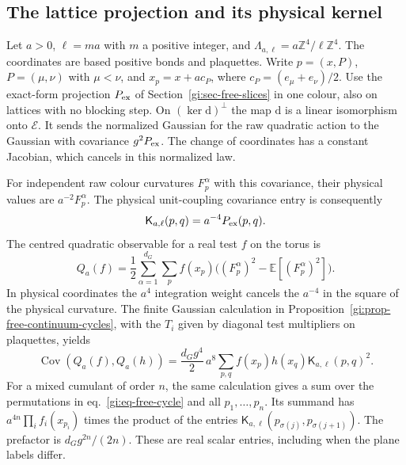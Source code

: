 \documentclass[11pt,letterpaper,reqno]{amsart}
\numberwithin{equation}{section}
\renewcommand{\eqref}[1]{\textup{eq.~\ref{#1}}}
\theoremstyle{definition}
\theoremstyle{remark}
\begin{document}
\subsection{The lattice projection and its physical kernel}

Let \(a>0\), \(\ell=ma\) with \(m\) a positive integer, and
\(\Lambda_{a,\ell}=a\mathbb Z^4/\ell\mathbb Z^4\).
The coordinates are based positive bonds and plaquettes.
Write \(p=(x,P)\), \(P=(\mu,\nu)\) with \(\mu<\nu\), and
\(x_p=x+ac_P\), where \(c_P=(e_\mu+e_\nu)/2\).
Use the exact-form projection \(P_{\rm ex}\) of
Section~\ref{gi:sec-free-slices} in one colour, also on lattices
with no blocking step. On \((\ker\mathrm d)^\perp\) the map
\(\mathrm d\) is a linear isomorphism onto \(\mathcal E\).
It sends the normalized Gaussian for the raw quadratic
action to the Gaussian with covariance \(g^2P_{\rm ex}\).
The change of coordinates has a constant Jacobian, which
cancels in this normalized law.

For independent raw colour curvatures \(F_p^\alpha\) with
this covariance, their physical values are \(a^{-2}F_p^\alpha\).
The physical unit-coupling covariance entry is consequently
\begin{equation}\label{gi:eq-lattice-curvature-kernel}
            \mathsf K_{a,\ell}(p,q)=a^{-4}P_{\rm ex}(p,q).
\end{equation}
The centred quadratic observable for a real test \(f\) on the
torus is
\begin{equation}\label{gi:eq-free-lattice-density}
 Q_a(f)=\frac12\sum_{\alpha=1}^{d_G}\sum_p f(x_p)
                \bigl((F_p^\alpha)^2-\mathbb E[(F_p^\alpha)^2]\bigr).
\end{equation}
In physical coordinates the \(a^4\) integration weight cancels
the \(a^{-4}\) in the square of the physical curvature.
The finite Gaussian calculation in
Proposition~\ref{gi:prop-free-continuum-cycles}, with the \(T_i\)
given by diagonal test multipliers on plaquettes, yields
\begin{equation}\label{gi:eq-free-lattice-wick}
 \operatorname{Cov}(Q_a(f),Q_a(h))
     =\frac{d_Gg^4}{2}\,a^8\sum_{p,q}
                      f(x_p)h(x_q)\mathsf K_{a,\ell}(p,q)^2 .
\end{equation}
For a mixed cumulant of order \(n\), the same calculation gives
a sum over the permutations in \eqref{gi:eq-free-cycle}
and all \(p_1,\ldots,p_n\). Its summand has
\(a^{4n}\prod_i f_i(x_{p_i})\) times the product of the entries
\(\mathsf K_{a,\ell}(p_{\sigma(j)},p_{\sigma(j+1)})\).
The prefactor is \(d_Gg^{2n}/(2n)\). These are real scalar
entries, including when the plane labels differ.
\end{document}
